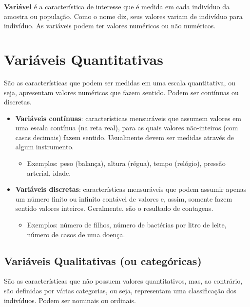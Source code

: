 \documentclass[
]{book}
\providecommand{\tightlist}{%
  \setlength{\itemsep}{0pt}\setlength{\parskip}{0pt}}
\begin{document}
\textbf{Variável} é a característica de interesse que é medida em cada indivíduo da amostra ou população. Como o nome diz, seus valores variam de indivíduo para indivíduo. As variáveis podem ter valores numéricos ou não numéricos.

\hypertarget{variuxe1veis-quantitativas}{%
\section{Variáveis Quantitativas}\label{variuxe1veis-quantitativas}}

São as características que podem ser medidas em uma escala quantitativa, ou seja, apresentam valores numéricos que fazem sentido. Podem ser contínuas ou discretas.

\begin{itemize}
\tightlist
\item
  \textbf{Variáveis contínuas}: características mensuráveis que assumem valores em uma escala contínua (na reta real), para as quais valores não-inteiros (com casas decimais) fazem sentido. Usualmente devem ser medidas através de algum instrumento.

  \begin{itemize}
  \tightlist
  \item
    Exemplos: peso (balança), altura (régua), tempo (relógio), pressão arterial, idade.
  \end{itemize}
\item
  \textbf{Variáveis discretas}: características mensuráveis que podem assumir apenas um número finito ou infinito contável de valores e, assim, somente fazem sentido valores inteiros. Geralmente, são o resultado de contagens.

  \begin{itemize}
  \tightlist
  \item
    Exemplos: número de filhos, número de bactérias por litro de leite, número de casos de uma doença.
  \end{itemize}
\end{itemize}

\hypertarget{variuxe1veis-qualitativas-ou-categuxf3ricas}{%
\subsection{Variáveis Qualitativas (ou categóricas)}\label{variuxe1veis-qualitativas-ou-categuxf3ricas}}

São as características que não possuem valores quantitativos, mas, ao contrário, são definidas por várias categorias, ou seja, representam uma classificação dos indivíduos. Podem ser nominais ou ordinais.
\end{document}
